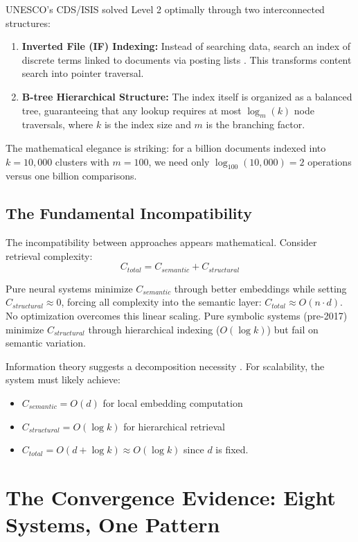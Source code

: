 \documentclass[manuscript,screen,review]{acmart}
\begin{document}
UNESCO's CDS/ISIS solved Level 2 optimally through two interconnected structures:
\begin{enumerate}
\item \textbf{Inverted File (IF) Indexing:} Instead of searching data, search an index of discrete terms linked to documents via posting lists \cite{zobel2006}. This transforms content search into pointer traversal.
\item \textbf{B-tree Hierarchical Structure:} The index itself is organized as a balanced tree, guaranteeing that any lookup requires at most $\log_m(k)$ node traversals, where $k$ is the index size and $m$ is the branching factor.
\end{enumerate}

The mathematical elegance is striking: for a billion documents indexed into $k = 10,000$ clusters with $m = 100$, we need only $\log_{100}(10,000) = 2$ operations versus one billion comparisons.

\subsection{The Fundamental Incompatibility}

The incompatibility between approaches appears mathematical. Consider retrieval complexity:
$$C_{total} = C_{semantic} + C_{structural}$$

Pure neural systems minimize $C_{semantic}$ through better embeddings while setting $C_{structural} \approx 0$, forcing all complexity into the semantic layer: $C_{total} \approx O(n \cdot d)$. No optimization overcomes this linear scaling. Pure symbolic systems (pre-2017) minimize $C_{structural}$ through hierarchical indexing ($O(\log k)$) but fail on semantic variation.

Information theory suggests a decomposition necessity \cite{chen2025}. For scalability, the system must likely achieve:
\begin{itemize}
\item $C_{semantic} = O(d)$ for local embedding computation
\item $C_{structural} = O(\log k)$ for hierarchical retrieval
\item $C_{total} = O(d + \log k) \approx O(\log k)$ since $d$ is fixed.
\end{itemize}

\section{The Convergence Evidence: Eight Systems, One Pattern}
\end{document}
